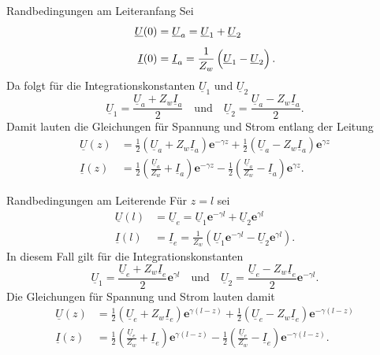 \documentclass{beamer}
\begin{document}
\begin{frame}{Randbedingungen am Leiteranfang}
Sei
\begin{align*}
    \underline{U}(0) &= \underline{U}_{a} = \underline{U}_{1} + \underline{U}_{2} \\[1ex]
    \underline{I}(0) &= \underline{I}_{a} = \frac{1}{Z_{w}}
    \left(
    \vphantom{\sqrt{1}{Z_{w}}}
    \underline{U}_{1} - \underline{U}_{2} \right).
\end{align*}
Da folgt für die Integrationskonstanten $\underline{U}_{1}$ und $\underline{U}_{2}$
\[ \underline{U}_{1} = \frac{\underline{U}_{a} + Z_{w} \underline{I}_{a}}{2} \quad \text{und} \quad \underline{U}_{2} =
\frac{\underline{U}_{a} - Z_{w} \underline{I}_{a}}{2}. \]
Damit lauten die Gleichungen für Spannung und Strom entlang der Leitung
\begin{align}
    \underline{U}(z) &=
    \frac{1}{2} \left( \underline{U}_{a} + Z_{w} \underline{I}_{a} \right) \mathbf{e}^{- \gamma z}
    +
    \frac{1}{2} \left( \underline{U}_{a} - Z_{w} \underline{I}_{a} \right) \mathbf{e}^{\gamma z} \label{eq:UxA} \\[1ex]
    \underline{I}(z) &=
    \frac{1}{2} \left( \frac{\underline{U}_{a}}{Z_{w}} + \underline{I}_{a} \right) \mathbf{e}^{- \gamma z}
    -
    \frac{1}{2} \left( \frac{\underline{U}_{a}}{Z_{w}} - \underline{I}_{a} \right) \mathbf{e}^{\gamma z} \label{eq:IxA}
    .
\end{align}

\end{frame}



\begin{frame}{Randbedingungen am Leiterende}
Für $z=l$ sei
\begin{align*}
    \underline{U}(l) &= \underline{U}_{e} = \underline{U}_{1} \mathbf{e}^{- \gamma l}
    +
    \underline{U}_{2} \mathbf{e}^{ \gamma l} \\[1ex]
    \underline{I}(l) &= \underline{I}_{e} = \frac{1}{Z_{w}}
    \left(
    \underline{U}_{1} \mathbf{e}^{- \gamma l}
    -
    \underline{U}_{2} \mathbf{e}^{ \gamma l}
    \right).
\end{align*}
In diesem Fall gilt für die Integrationskonstanten
\[ \underline{U}_{1} = \frac{\underline{U}_{e} + Z_{w} \underline{I}_{e}}{2} \mathbf{e}^{\gamma l} \quad \text{und}
\quad \underline{U}_{2} = \frac{\underline{U}_{e} - Z_{w} \underline{I}_{e}}{2} \mathbf{e}^{- \gamma l}. \]
Die Gleichungen für Spannung und Strom lauten damit
\begin{align}
    \underline{U}(z) &=
    \frac{1}{2} \left( \underline{U}_{e} + Z_{w} \underline{I}_{e} \right) \mathbf{e}^{\gamma (l - z)}
    +
    \frac{1}{2} \left( \underline{U}_{e} - Z_{w} \underline{I}_{e} \right) \mathbf{e}^{- \gamma (l - z)} \label{eq:UxE}
    \\[1ex]
    \underline{I}(z) &=
    \frac{1}{2} \left( \frac{\underline{U}_{e}}{Z_{w}} + \underline{I}_{e} \right) \mathbf{e}^{\gamma (l - z)}
    -
    \frac{1}{2} \left( \frac{\underline{U}_{e}}{Z_{w}} - \underline{I}_{e} \right) \mathbf{e}^{- \gamma (l - z)}
    \label{eq:IxE} .
\end{align}

\end{frame}
\end{document}
